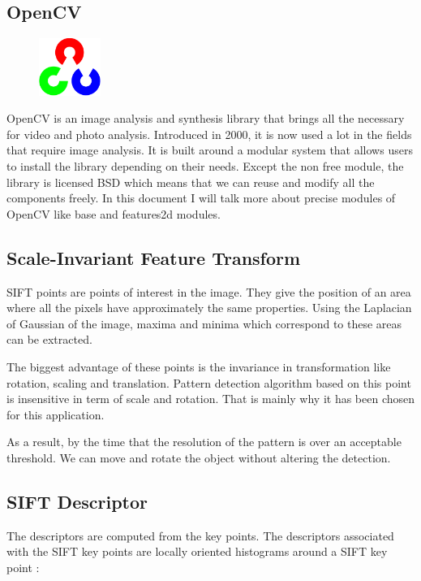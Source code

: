 \documentclass[english,a4paper,11pt]{report}
\begin{document}
	\subsection{OpenCV}
	\begin{figure}
	\vspace{-7mm}
	\includegraphics[width=2cm]{images_not_compressed/opencv_logo.png}
	\end{figure}
	\par OpenCV is an image analysis and synthesis library that brings all the necessary for video and photo analysis. Introduced in 2000, it is now used a lot in the fields that require image analysis.
 It is built around a modular system that allows users to install the library depending on their needs.
 Except the non free module, the library is licensed BSD which means that we can reuse and modify all the components freely.
 In this document I will talk more about precise modules of OpenCV like base and features2d modules. 
	\subsection[SIFT points]{Scale-Invariant Feature Transform}
	\par SIFT points are points of interest in the image. They give the position of an area where all the pixels have approximately the same properties. Using the Laplacian of Gaussian of the image, maxima and minima which correspond to these areas can be extracted.
	\par The biggest advantage of these points is the invariance in transformation like rotation, scaling and translation. Pattern detection algorithm based on this point is insensitive in term of scale and rotation. That is mainly why it has been chosen for this application.
	\par As a result, by the time that the resolution of the pattern is over an acceptable threshold. We can move and rotate the object without altering the detection.
	
	\subsection[Descriptor]{SIFT Descriptor}
	\par The descriptors are computed from the key points. The descriptors associated with the SIFT key points are locally oriented histograms around a SIFT key point \cite{AM}:
	
\end{document}
